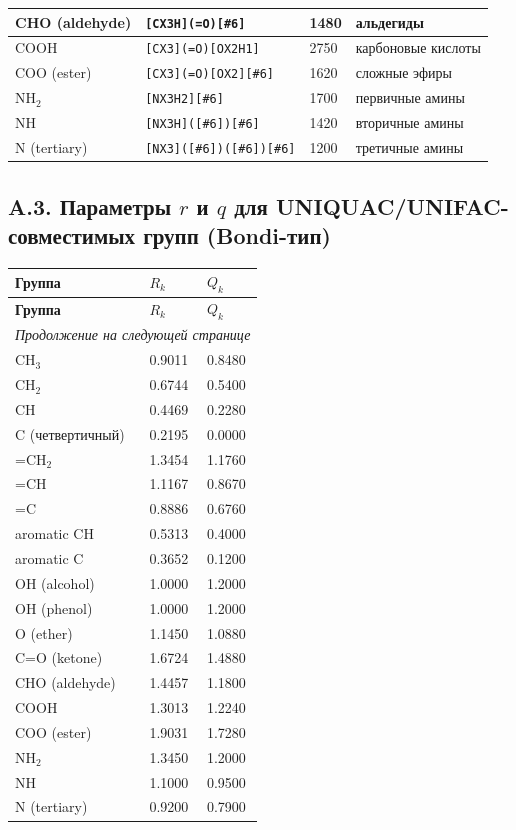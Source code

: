 \documentclass[11pt]{article}
\newcommand{\smarts}[1]{\nolinkurl{#1}}
\begin{document}
\begin{center}
\begin{longtable}{|P{2.7cm}|T{4.0cm}|C{2.4cm}|P{3.8cm}|}
\hline
CHO (aldehyde) & \smarts{[CX3H](=O)[\#6]} & 1480 & альдегиды \\
\hline
COOH & \smarts{[CX3](=O)[OX2H1]} & 2750 & карбоновые кислоты \\
\hline
COO (ester) & \smarts{[CX3](=O)[OX2][\#6]} & 1620 & сложные эфиры \\
\hline
NH$_2$ & \smarts{[NX3H2][\#6]} & 1700 & первичные амины \\
\hline
NH & \smarts{[NX3H]([\#6])[\#6]} & 1420 & вторичные амины \\
\hline
N (tertiary) & \smarts{[NX3]([\#6])([\#6])[\#6]} & 1200 & третичные амины \\
\hline
\end{longtable}
\normalsize
\end{center}

\subsection*{A.3. Параметры $r$ и $q$ для UNIQUAC/UNIFAC-совместимых групп (Bondi-тип)}

\begin{center}
\small
\begin{longtable}{|p{4.2cm}|p{2.4cm}|p{2.4cm}|}
\hline
\textbf{Группа} & \textbf{$R_k$} & \textbf{$Q_k$} \\
\hline
\endfirsthead
\hline
\textbf{Группа} & \textbf{$R_k$} & \textbf{$Q_k$} \\
\hline
\endhead
\hline
\multicolumn{3}{r}{\textit{Продолжение на следующей странице}} \\
\hline
\endfoot
\hline
\endlastfoot
CH$_3$ & 0.9011 & 0.8480 \\
\hline
CH$_2$ & 0.6744 & 0.5400 \\
\hline
CH & 0.4469 & 0.2280 \\
\hline
C (четвертичный) & 0.2195 & 0.0000 \\
\hline
=CH$_2$ & 1.3454 & 1.1760 \\
\hline
=CH & 1.1167 & 0.8670 \\
\hline
=C & 0.8886 & 0.6760 \\
\hline
aromatic CH & 0.5313 & 0.4000 \\
\hline
aromatic C & 0.3652 & 0.1200 \\
\hline
OH (alcohol) & 1.0000 & 1.2000 \\
\hline
OH (phenol) & 1.0000 & 1.2000 \\
\hline
O (ether) & 1.1450 & 1.0880 \\
\hline
C=O (ketone) & 1.6724 & 1.4880 \\
\hline
CHO (aldehyde) & 1.4457 & 1.1800 \\
\hline
COOH & 1.3013 & 1.2240 \\
\hline
COO (ester) & 1.9031 & 1.7280 \\
\hline
NH$_2$ & 1.3450 & 1.2000 \\
\hline
NH & 1.1000 & 0.9500 \\
\hline
N (tertiary) & 0.9200 & 0.7900 \\
\hline
\end{longtable}
\normalsize
\end{center}
\end{document}
